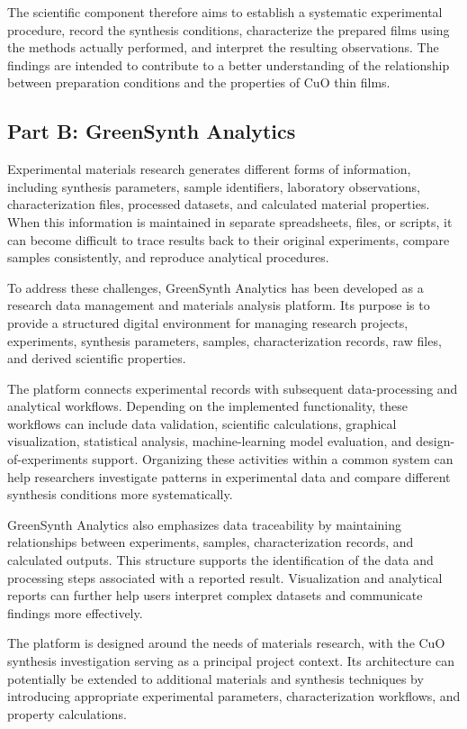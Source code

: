 \documentclass[12pt,a4paper,oneside]{report}
\begin{document}
{{{The scientific component therefore aims to establish a systematic experimental procedure, record the synthesis conditions, characterize the prepared films using the methods actually performed, and interpret the resulting observations. The findings are intended to contribute to a better understanding of the relationship between preparation conditions and the properties of $\text{CuO}$ thin films.

\subsection{Part B: GreenSynth Analytics}

Experimental materials research generates different forms of information, including synthesis parameters, sample identifiers, laboratory observations, characterization files, processed datasets, and calculated material properties. When this information is maintained in separate spreadsheets, files, or scripts, it can become difficult to trace results back to their original experiments, compare samples consistently, and reproduce analytical procedures.

To address these challenges, GreenSynth Analytics has been developed as a research data management and materials analysis platform. Its purpose is to provide a structured digital environment for managing research projects, experiments, synthesis parameters, samples, characterization records, raw files, and derived scientific properties.

The platform connects experimental records with subsequent data-processing and analytical workflows. Depending on the implemented functionality, these workflows can include data validation, scientific calculations, graphical visualization, statistical analysis, machine-learning model evaluation, and design-of-experiments support. Organizing these activities within a common system can help researchers investigate patterns in experimental data and compare different synthesis conditions more systematically.

GreenSynth Analytics also emphasizes data traceability by maintaining relationships between experiments, samples, characterization records, and calculated outputs. This structure supports the identification of the data and processing steps associated with a reported result. Visualization and analytical reports can further help users interpret complex datasets and communicate findings more effectively.

The platform is designed around the needs of materials research, with the $\text{CuO}$ synthesis investigation serving as a principal project context. Its architecture can potentially be extended to additional materials and synthesis techniques by introducing appropriate experimental parameters, characterization workflows, and property calculations.

}}}
\end{document}
